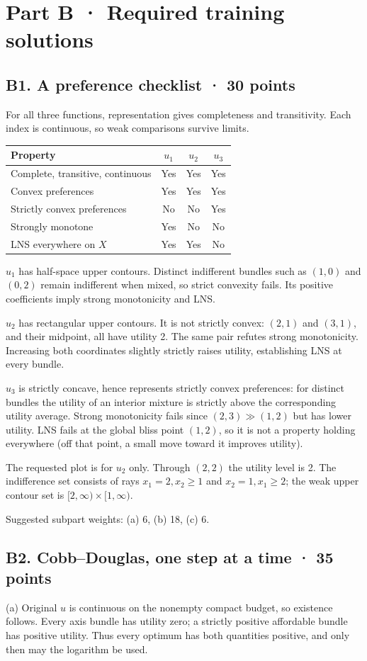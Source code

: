 \section*{Part B · Required training solutions}
\subsection*{B1. A preference checklist · 30 points}
For all three functions, representation gives completeness and transitivity. Each index is continuous, so weak comparisons survive limits.
\begin{center}\small\begin{tabular}{lccc}
Property & $u_1$ & $u_2$ & $u_3$\\\hline
Complete, transitive, continuous & Yes & Yes & Yes\\
Convex preferences & Yes & Yes & Yes\\
Strictly convex preferences & No & No & Yes\\
Strongly monotone & Yes & No & No\\
LNS everywhere on $X$ & Yes & Yes & No
\end{tabular}\end{center}
$u_1$ has half-space upper contours. Distinct indifferent bundles such as $(1,0)$ and $(0,2)$ remain indifferent when mixed, so strict convexity fails. Its positive coefficients imply strong monotonicity and LNS.

$u_2$ has rectangular upper contours. It is not strictly convex: $(2,1)$ and $(3,1)$, and their midpoint, all have utility 2. The same pair refutes strong monotonicity. Increasing both coordinates slightly strictly raises utility, establishing LNS at every bundle.

$u_3$ is strictly concave, hence represents strictly convex preferences: for distinct bundles the utility of an interior mixture is strictly above the corresponding utility average. Strong monotonicity fails since $(2,3)\gg(1,2)$ but has lower utility. LNS fails at the global bliss point $(1,2)$, so it is not a property holding everywhere (off that point, a small move toward it improves utility).

The requested plot is for $u_2$ only. Through $(2,2)$ the utility level is 2. The indifference set consists of rays $x_1=2,x_2\ge1$ and $x_2=1,x_1\ge2$; the weak upper contour set is $[2,\infty)\times[1,\infty)$.

Suggested subpart weights: (a) 6, (b) 18, (c) 6.

\subsection*{B2. Cobb--Douglas, one step at a time · 35 points}
(a) Original $u$ is continuous on the nonempty compact budget, so existence follows. Every axis bundle has utility zero; a strictly positive affordable bundle has positive utility. Thus every optimum has both quantities positive, and only then may the logarithm be used.

